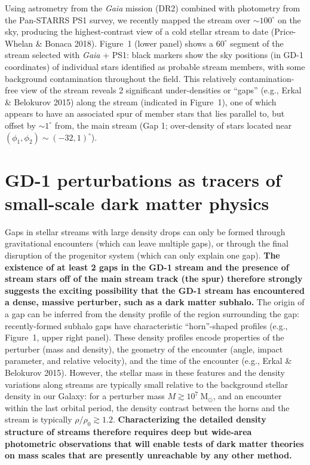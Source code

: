 \documentclass[11pt]{article}
\newcommand{\msun}{\textrm{M}_\odot}
\begin{document}
Using astrometry from the \textit{Gaia} mission (DR2) combined with photometry from the Pan-STARRS PS1 survey, we recently mapped the stream over $\sim 100^\circ$ on the sky, producing the highest-contrast view of a cold stellar stream to date (Price-Whelan \& Bonaca 2018).
Figure~1 (lower panel) shows a $60^\circ$ segment of the stream selected with \textit{Gaia} + PS1: black markers show the sky positions (in GD-1 coordinates) of individual stars identified as probable stream members, with some background contamination throughout the field.
This relatively contamination-free view of the stream reveals 2 significant under-densities or ``gaps'' (e.g., Erkal \& Belokurov 2015) along the stream (indicated in Figure~1), one of which appears to have an associated spur of member stars that lies parallel to, but offset by $\sim1^\circ$ from, the main stream (Gap 1; over-density of stars located near $(\phi_1, \phi_2) \sim (-32, 1)^\circ$).


\section*{GD-1 perturbations as tracers of small-scale dark matter physics}

Gaps in stellar streams with large density drops can only be formed through gravitational encounters (which can leave multiple gaps), or through the final disruption of the progenitor system (which can only explain one gap).
\textbf{The existence of at least 2 gaps in the GD-1 stream and the presence of stream stars off of the main stream track (the spur) therefore strongly suggests the exciting possibility that the GD-1 stream has encountered a dense, massive perturber, such as a dark matter subhalo.}
The origin of a gap can be inferred from the density profile of the region surrounding the gap: recently-formed subhalo gaps have characteristic ``horn''-shaped profiles (e.g., Figure~1, upper right panel).
These density profiles encode properties of the perturber (mass and density), the geometry of the encounter (angle, impact parameter, and relative velocity), and the time of the encounter (e.g., Erkal \& Belokurov 2015).
However, the stellar mass in these features and the density variations along streams are typically small relative to the background stellar density in our Galaxy: for a perturber mass $M \gtrsim 10^7~\msun$, and an encounter within the last orbital period, the density contrast between the horns and the stream is typically $\rho/\rho_0 \gtrsim 1.2$.
\textbf{Characterizing the detailed density structure of streams therefore requires deep but wide-area photometric observations that will enable tests of dark matter theories on mass scales that are presently unreachable by any other method.}
\end{document}
